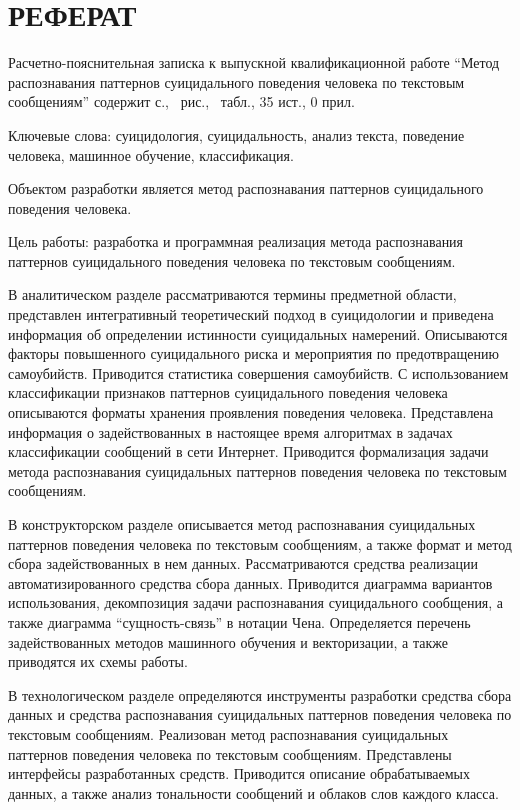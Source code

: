 \section*{РЕФЕРАТ}

Расчетно-пояснительная записка к выпускной квалификационной работе ``Метод распознавания паттернов суицидального поведения человека по текстовым сообщениям'' содержит \pageref{LastPage} с., \totalfigures\ рис., \totaltables\ табл., 35 ист., 0 прил.

Ключевые слова: суицидология, суицидальность, анализ текста, поведение человека, машинное обучение, классификация.

Объектом разработки является метод распознавания паттернов суицидального поведения человека.

Цель работы: разработка и программная реализация метода распознавания паттернов суицидального поведения человека по текстовым сообщениям.

В аналитическом разделе рассматриваются термины предметной области, представлен интегративный теоретический подход в суицидологии и приведена информация об определении истинности суицидальных намерений. 
Описываются факторы повышенного суицидального риска и мероприятия по предотвращению самоубийств. 
Приводится статистика совершения самоубийств.
С использованием классификации признаков паттернов суицидального поведения человека описываются форматы хранения проявления поведения человека.
Представлена информация о задействованных в настоящее время алгоритмах в задачах классификации сообщений в сети Интернет.
Приводится формализация задачи метода распознавания суицидальных паттернов поведения человека по текстовым сообщениям.

В конструкторском разделе описывается метод распознавания суицидальных паттернов поведения человека по текстовым сообщениям, а также формат и метод сбора задействованных в нем данных.
Рассматриваются средства реализации автоматизированного средства сбора данных.
Приводится диаграмма вариантов использования, декомпозиция задачи распознавания суицидального сообщения, а также диаграмма ``сущность-связь'' в нотации Чена.
Определяется перечень задействованных методов машинного обучения и векторизации, а также приводятся их схемы работы.

В технологическом разделе определяются инструменты разработки средства сбора данных и средства распознавания суицидальных паттернов поведения человека по текстовым сообщениям.
Реализован метод распознавания суицидальных паттернов поведения человека по текстовым сообщениям. 
Представлены интерфейсы разработанных средств. 
Приводится описание обрабатываемых данных, а также анализ тональности сообщений и облаков слов каждого класса.

